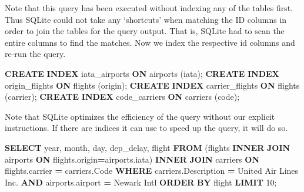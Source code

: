 \documentclass[
  12pt,
]{style/krantz}
\newenvironment{Shaded}{\begin{snugshade}}{\end{snugshade}}
\newcommand{\DataTypeTok}[1]{\textcolor[rgb]{0.13,0.29,0.53}{#1}}
\newcommand{\DecValTok}[1]{\textcolor[rgb]{0.00,0.00,0.81}{#1}}
\newcommand{\KeywordTok}[1]{\textcolor[rgb]{0.13,0.29,0.53}{\textbf{#1}}}
\newcommand{\NormalTok}[1]{#1}
\newcommand{\OperatorTok}[1]{\textcolor[rgb]{0.81,0.36,0.00}{\textbf{#1}}}
\newcommand{\StringTok}[1]{\textcolor[rgb]{0.31,0.60,0.02}{#1}}
\begin{document}
Note that this query has been executed without indexing any of the tables first. Thus SQLite could not take any `shortcuts' when matching the ID columns in order to join the tables for the query output. That is, SQLite had to scan the entire columns to find the matches. Now we index the respective id columns and re-run the query.

\begin{Shaded}
\begin{Highlighting}[]
\KeywordTok{CREATE} \KeywordTok{INDEX}\NormalTok{ iata\_airports }\KeywordTok{ON}\NormalTok{ airports (iata);}
\KeywordTok{CREATE} \KeywordTok{INDEX}\NormalTok{ origin\_flights }\KeywordTok{ON}\NormalTok{ flights (origin);}
\KeywordTok{CREATE} \KeywordTok{INDEX}\NormalTok{ carrier\_flights }\KeywordTok{ON}\NormalTok{ flights (carrier);}
\KeywordTok{CREATE} \KeywordTok{INDEX}\NormalTok{ code\_carriers }\KeywordTok{ON}\NormalTok{ carriers (code);}
\end{Highlighting}
\end{Shaded}

Note that SQLite optimizes the efficiency of the query without our explicit instructions. If there are indices it can use to speed up the query, it will do so.

\begin{Shaded}
\begin{Highlighting}[]
\KeywordTok{SELECT} 
\DataTypeTok{year}\NormalTok{,}
\DataTypeTok{month}\NormalTok{, }
\DataTypeTok{day}\NormalTok{,}
\NormalTok{dep\_delay,}
\NormalTok{flight}
\KeywordTok{FROM}\NormalTok{ (flights }\KeywordTok{INNER} \KeywordTok{JOIN}\NormalTok{ airports }\KeywordTok{ON}\NormalTok{ flights.origin}\OperatorTok{=}\NormalTok{airports.iata) }
\KeywordTok{INNER} \KeywordTok{JOIN}\NormalTok{ carriers }\KeywordTok{ON}\NormalTok{ flights.carrier }\OperatorTok{=}\NormalTok{ carriers.Code}
\KeywordTok{WHERE}\NormalTok{ carriers.Description }\OperatorTok{=} \StringTok{\textquotesingle{}United Air Lines Inc.\textquotesingle{}}
\KeywordTok{AND}\NormalTok{ airports.airport }\OperatorTok{=} \StringTok{\textquotesingle{}Newark Intl\textquotesingle{}}
\KeywordTok{ORDER} \KeywordTok{BY}\NormalTok{ flight}
\KeywordTok{LIMIT} \DecValTok{10}\NormalTok{;}
\end{Highlighting}
\end{Shaded}
\end{document}
